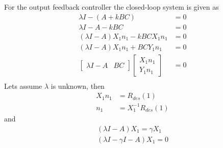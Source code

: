 For the output feedback controller the closed-loop system is given as
\begin{equation}
\begin{split}
    \lambda I-(A+kBC)&=0\\
    \lambda I-A-kBC&=0\\
    (\lambda I-A)X_1n_1-kBCX_1n_1&=0\\
    (\lambda I-A)X_1n_1+BCY_1n_1&=0\\
    \begin{bmatrix}\lambda I-A& BC\end{bmatrix}\begin{bmatrix}X_1n_1\\Y_1n_1\end{bmatrix}&=0\\
\end{split}
\end{equation}
Lets assume $\lambda$ is unknown, then 
\begin{equation}
    \begin{split}
        X_1n_1&=R_{des}(1)\\
        n_1&=X_1^{-1}R_{des}(1)
    \end{split}
\end{equation}
and 
\begin{equation}
\begin{split}
    (\lambda I-A)X_1=\gamma X_1\\
    (\lambda I-\gamma I-A)X_1=0
\end{split}
\end{equation}

